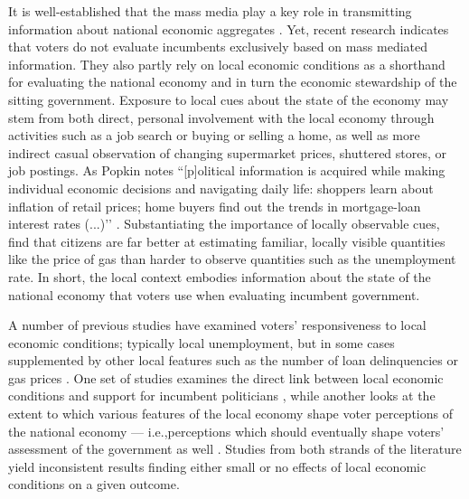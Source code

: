\documentclass[12pt,a4paper]{article}
\begin{document}
	It is well-established that the mass media play a key role in transmitting information about national economic aggregates \citep[e.g.,][]{soroka2015s}. Yet, recent research indicates that voters do not evaluate incumbents exclusively based on mass mediated information. They also partly rely on local economic conditions as a shorthand for evaluating the national economy \citep{bisgaard2016reconsidering, reeves2012ecologies} and in turn the economic stewardship of the sitting government. Exposure to local cues about the state of the economy may stem from both direct, personal involvement with the local economy through activities such as a job search or buying or selling a home, as well as more indirect casual observation of changing supermarket prices, shuttered stores, or job postings. As Popkin \citeyearpar[][p. 24]{popkin1994reasoning} notes ``[p]olitical information is acquired while making individual economic decisions and navigating daily life: shoppers learn about inflation of retail prices; home buyers find out the trends in mortgage-loan interest rates (...)’’ \cite[see also][p. 5]{fiorina1981retrospective}. Substantiating the importance of locally observable cues, \citep{ansolabehere2012asking} find that citizens are far better at estimating familiar, locally visible quantities like the price of gas than harder to observe quantities such as the unemployment rate. In short, the local context embodies information about the state of the national economy that voters use when evaluating incumbent government. 
	
	A number of previous studies have examined voters’ responsiveness to local economic conditions; typically local unemployment, but in some cases supplemented by other local features such as the number of loan delinquencies \citep{healy2017presidential} or gas prices \citep{reeves2012ecologies}. One set of studies examines the direct link between local economic conditions and support for incumbent politicians \citep{hansford2015reevaluating,eisenberg2004economic,kim2003spatial,healy2017presidential, auberger2005influence,wright2012unemployment, hill2010economic, elinder2010local, johnston2001s,veiga2010impact, kim2003spatial}, while another looks at the extent to which various features of the local economy shape voter perceptions of the national economy — i.e.,perceptions which should eventually shape voters’ assessment of the government as well  \citep{books1999contextual, reeves2012ecologies,anderson2011local,ansolabehere2014mecro,bisgaard2016reconsidering}. Studies from both strands of the literature yield inconsistent results finding either small or no effects of local economic conditions on a given outcome.   
	
\end{document}

